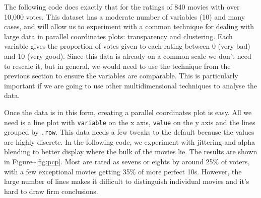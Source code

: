 The following code does exactly that for the ratings of 840 movies with
over 10,000 votes. This dataset has a moderate number of variables (10)
and many cases, and will allow us to experiment with a common technique
for dealing with large data in parallel coordinates plots: transparency
and clustering. Each variable gives the proportion of votes given to
each rating between 0 (very bad) and 10 (very good). Since this data is
already on a common scale we don't need to rescale it, but in general,
we would need to use the technique from the previous section to ensure
the variables are comparable. This is particularly important if we are
going to use other multidimensional techniques to analyse the data.

\begin{Shaded}
\begin{Highlighting}[]
\StringTok{ }\StringTok{ }\NormalTok{)}
\StringTok{ }\NormalTok{popular[, }\NormalTok{:}\NormalTok{]}
\StringTok{ }
\StringTok{ }
\end{Highlighting}
\end{Shaded}

Once the data is in this form, creating a parallel coordinates plot is
easy. All we need is a line plot with \texttt{variable} on the x axis,
\texttt{value} on the y axis and the lines grouped by \texttt{.row}.
This data needs a few tweaks to the default because the values are
highly discrete. In the following code, we experiment with jittering and
alpha blending to better display where the bulk of the movies lie. The
results are shown in Figure\textasciitilde{}\ref{fig:pcp}. Most are
rated as sevens or eights by around 25\% of voters, with a few
exceptional movies getting 35\% of more perfect 10s. However, the large
number of lines makes it difficult to distinguish individual movies and
it's hard to draw firm conclusions. 

\begin{Shaded}
\begin{Highlighting}[]
\StringTok{ } 
\StringTok{ }\NormalTok{()}
\StringTok{ }\NormalTok{(}  \NormalTok{/}\StringTok{ }\NormalTok{)}
\StringTok{ }\NormalTok{(} \NormalTok{, } \NormalTok{)}
\StringTok{ }\NormalTok{(} 
\StringTok{ }\NormalTok{(}  \NormalTok{/}\StringTok{ }\NormalTok{, } 
\end{Highlighting}
\end{Shaded}

